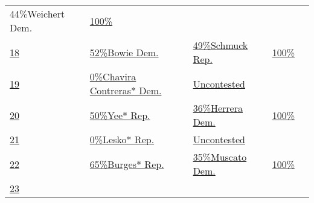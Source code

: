 \begin{longtable}[]{@{}lllll@{}}
{44\%Weichert Dem.} &
\href{//www.nytimes.com/elections/2016/results/arizona-state-senate-district-17}{100\%}
&
\href{//www.nytimes.com/elections/2016/results/arizona-state-senate-district-17}{}\tabularnewline
\href{//www.nytimes.com/elections/2016/results/arizona-state-senate-district-18}{18}
&
\href{//www.nytimes.com/elections/2016/results/arizona-state-senate-district-18}{
52\%Bowie Dem.} &
\href{//www.nytimes.com/elections/2016/results/arizona-state-senate-district-18}{
49\%Schmuck Rep.} &
\href{//www.nytimes.com/elections/2016/results/arizona-state-senate-district-18}{100\%}
&
\href{//www.nytimes.com/elections/2016/results/arizona-state-senate-district-18}{}\tabularnewline
\href{//www.nytimes.com/elections/2016/results/arizona-state-senate-district-19}{19}
&
\href{//www.nytimes.com/elections/2016/results/arizona-state-senate-district-19}{
0\%Chavira Contreras* Dem.} &
\href{//www.nytimes.com/elections/2016/results/arizona-state-senate-district-19}{Uncontested}
&
\href{//www.nytimes.com/elections/2016/results/arizona-state-senate-district-19}{}
&
\href{//www.nytimes.com/elections/2016/results/arizona-state-senate-district-19}{}\tabularnewline
\href{//www.nytimes.com/elections/2016/results/arizona-state-senate-district-20}{20}
&
\href{//www.nytimes.com/elections/2016/results/arizona-state-senate-district-20}{
50\%Yee* Rep.} &
\href{//www.nytimes.com/elections/2016/results/arizona-state-senate-district-20}{
36\%Herrera Dem.} &
\href{//www.nytimes.com/elections/2016/results/arizona-state-senate-district-20}{100\%}
&
\href{//www.nytimes.com/elections/2016/results/arizona-state-senate-district-20}{}\tabularnewline
\href{//www.nytimes.com/elections/2016/results/arizona-state-senate-district-21}{21}
&
\href{//www.nytimes.com/elections/2016/results/arizona-state-senate-district-21}{
0\%Lesko* Rep.} &
\href{//www.nytimes.com/elections/2016/results/arizona-state-senate-district-21}{Uncontested}
&
\href{//www.nytimes.com/elections/2016/results/arizona-state-senate-district-21}{}
&
\href{//www.nytimes.com/elections/2016/results/arizona-state-senate-district-21}{}\tabularnewline
\href{//www.nytimes.com/elections/2016/results/arizona-state-senate-district-22}{22}
&
\href{//www.nytimes.com/elections/2016/results/arizona-state-senate-district-22}{
65\%Burges* Rep.} &
\href{//www.nytimes.com/elections/2016/results/arizona-state-senate-district-22}{
35\%Muscato Dem.} &
\href{//www.nytimes.com/elections/2016/results/arizona-state-senate-district-22}{100\%}
&
\href{//www.nytimes.com/elections/2016/results/arizona-state-senate-district-22}{}\tabularnewline
\href{//www.nytimes.com/elections/2016/results/arizona-state-senate-district-23}{23}

\end{longtable}
